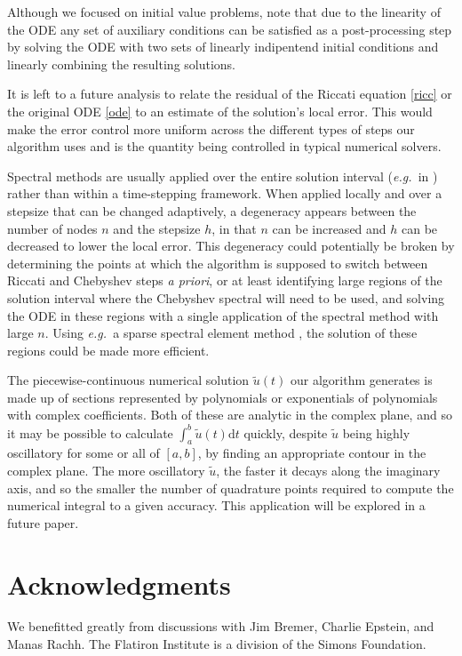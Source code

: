 \documentclass[10pt]{article}
\newcommand{\eg}{{\it e.g.\ }}
\begin{document}
Although we focused on initial value problems, note that due to the linearity
of the ODE any set of auxiliary conditions can be satisfied as a
post-processing step by solving the ODE with two sets of linearly indipentend
initial conditions and linearly combining the resulting solutions.

It is left to a future analysis to relate the residual of the Riccati equation
\cref{ricc} or the original ODE \cref{ode} to an estimate of the solution's
local error. This would make the error control more uniform across the
different types of steps our algorithm uses and is the quantity being
controlled in typical numerical solvers.  

Spectral methods are usually applied over the entire solution interval (\eg in
\cite{driscoll2008}) rather than within a time-stepping framework. When applied
locally and over a stepsize that can be changed adaptively, a degeneracy
appears between the number of nodes $n$ and the stepsize $h$, in that $n$ can
be increased and $h$ can be decreased to lower the local error. This degeneracy
could potentially be broken by determining the points at which the algorithm is
supposed to switch between Riccati and Chebyshev steps \emph{a priori}, or at
least identifying large regions of the solution interval where the Chebyshev
spectral will need to be used, and solving the ODE in these regions with a
single application of the spectral method with large $n$. Using \eg a sparse
spectral element method \cite{fortunato2021}, the solution of these regions
could be made more efficient.

The piecewise-continuous numerical solution $\tilde{u}(t)$ our algorithm generates is made up
of sections represented by polynomials or exponentials of polynomials with
complex coefficients. Both of these are analytic in the complex plane, and so
it may be possible to calculate $\int_a^b \tilde{u}(t)\mathrm{d}t$ quickly,
despite $\tilde{u}$ being highly oscillatory for some or all of $[a, b]$, by
finding an appropriate contour in the complex plane. The more oscillatory
$\tilde{u}$, the faster it decays along the imaginary axis, and so the smaller
the number of quadrature points required to compute the numerical integral to a
given accuracy. This application will be explored in a future paper.

\section*{Acknowledgments}
We benefitted greatly from discussions with Jim Bremer, Charlie Epstein,
and Manas Rachh.
The Flatiron Institute is a division of the Simons Foundation.
\end{document}
